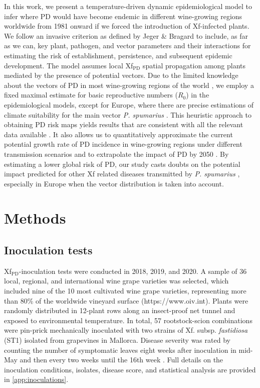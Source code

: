 In this work, we present a temperature-driven dynamic epidemiological model to
infer where PD would have become endemic in different wine-growing regions
worldwide from 1981 onward if we forced the introduction of Xf-infected plants.
We follow an invasive criterion as defined by Jeger \& Bragard \cite{Jeger2019}
to include, as far as we can, key plant, pathogen, and vector parameters and
their interactions for estimating the risk of establishment, persistence, and
subsequent epidemic development. The model assumes local Xf$_{\textrm{PD}}$
spatial propagation among plants mediated by the presence of potential vectors.
Due to the limited knowledge about the vectors of PD in most wine-growing
regions of the world \cite{Redak2004}, we employ a fixed maximal estimate for
basic reproductive numbers ($R_0$) in the epidemiological models, except for
Europe, where there are precise estimations of climate suitability for the main
vector \textit{P. spumarius} \cite{Godefroid2021}. This heuristic approach to
obtaining PD risk maps yields results that are consistent with all the relevant
data available \cite{Bragard2019}. It also allows us to quantitatively
approximate the current potential growth rate of PD incidence in wine-growing
regions under different transmission scenarios and to extrapolate the
impact of PD by 2050 \cite{Webpage}. By estimating a lower global risk of PD,
our study casts doubts on the potential impact predicted for other Xf related
diseases transmitted by \textit{P. spumarius} \cite{Schneider2020}, especially
in Europe when the vector distribution is taken into account.

\section{Methods}
\subsection{Inoculation tests}

Xf$_{\textrm{PD}}$-inoculation tests were
conducted in 2018, 2019, and 2020. A sample of 36 local, regional, and
international wine grape varieties was selected, which included nine of the
10 most cultivated wine grape varieties, representing more than 80\% of the
worldwide vineyard surface (https://www.oiv.int). Plants were randomly
distributed in 12-plant rows along an insect-proof net tunnel and exposed
to environmental temperature. In total, 57 rootstock-scion combinations were
pin-prick mechanically inoculated \cite{Almeida2003} with two strains of
Xf. subsp. \textit{fastidiosa} (ST1) isolated from grapevines in Mallorca.
Disease severity was rated by counting the number of symptomatic leaves eight
weeks after inoculation in mid-May and then every two weeks until the 16th week
\cite{Moralejo2019}. Full details on the inoculation conditions, isolates,
disease score, and statistical analysis are provided in
\cref{app:inoculations}.

